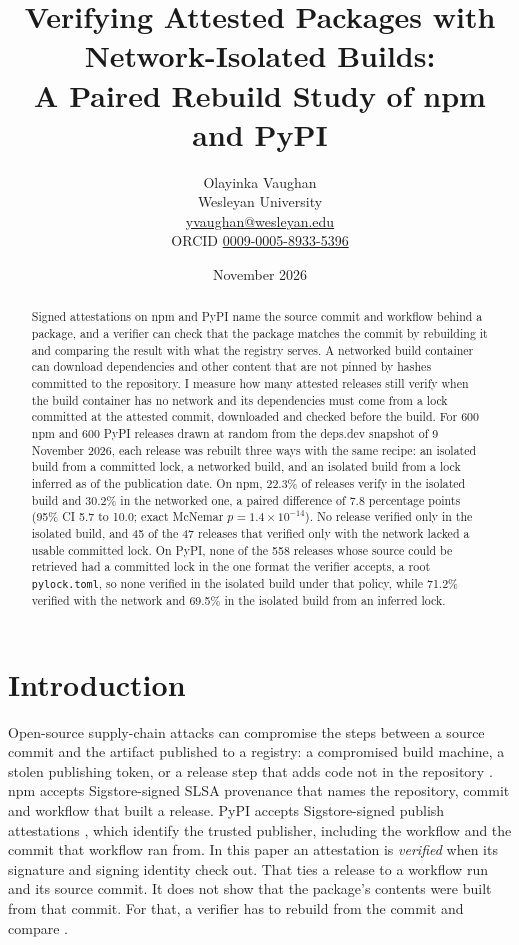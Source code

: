 \documentclass[11pt]{article}
\title{Verifying Attested Packages with Network-Isolated Builds:\\
A Paired Rebuild Study of npm and PyPI}
\author{Olayinka Vaughan\\
\small Wesleyan University\\
\small \href{mailto:yvaughan@wesleyan.edu}{yvaughan@wesleyan.edu}\\
\small ORCID \href{https://orcid.org/0009-0005-8933-5396}{0009-0005-8933-5396}}
\date{November 2026}
\begin{document}
\maketitle

\begin{abstract}
Signed attestations on npm and PyPI name the source commit and workflow
behind a package, and a verifier can check that the package matches the
commit by rebuilding it and comparing the result with what the registry
serves. A networked build container can download dependencies and other
content that are not pinned by hashes committed to the repository. I measure how many attested releases still
verify when the build container has no network and its dependencies must
come from a lock committed at the attested commit, downloaded and checked
before the build. For 600 npm and 600
PyPI releases drawn at random from the deps.dev snapshot of 9 November
2026, each release was rebuilt three ways with the same recipe: an
isolated build from a committed lock, a networked build, and an isolated
build from a lock inferred as of the publication date. On npm, 22.3\% of releases
verify in the isolated build and 30.2\% in the networked one, a paired
difference of 7.8 percentage points (95\% CI 5.7 to 10.0; exact McNemar
$p = 1.4\times10^{-14}$). No release verified only in the isolated build,
and 45 of the 47 releases that verified only with the network lacked a
usable committed lock. On PyPI, none of the 558 releases whose source
could be retrieved had a committed lock in the one format the verifier
accepts, a root \texttt{pylock.toml}, so none verified in the isolated
build under that policy, while 71.2\% verified with the network and
69.5\% in the isolated build from an inferred lock.
\end{abstract}

\section{Introduction}

Open-source supply-chain attacks can compromise the steps between a
source commit and the artifact published to a registry: a compromised
build machine, a stolen publishing token, or a release step that adds
code not in the repository \cite{ladisa2023,ohm2020}. npm accepts Sigstore-signed \cite{newman2022} SLSA provenance
\cite{npmprov,slsa} that names the repository, commit and workflow that
built a release. PyPI accepts Sigstore-signed publish attestations
\cite{pep740}, which identify the trusted publisher, including the
workflow and the commit that workflow ran from. In this paper an
attestation is \emph{verified} when its signature and signing identity
check out. That ties a release to a workflow run and its source commit.
It does not show that the package's contents were built from that
commit. For that, a verifier
has to rebuild from the commit and compare
\cite{lamb2022,ossrebuild}.
\end{document}
